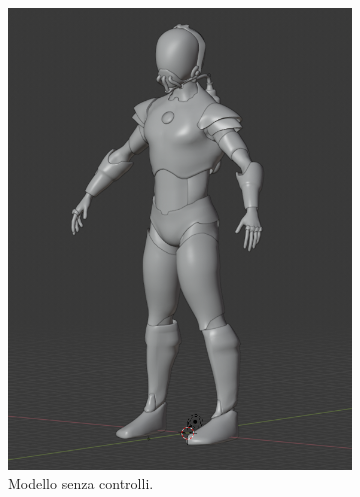 \begin{figure}
\centering
\begin{subfigure}{.33\textwidth}
  \centering
  \includegraphics[width=\linewidth]{Figures/rig0}
  \caption{Modello senza controlli.\\}
  \vspace{13pt}
  \label{fig:rig0}
\end{subfigure}%
\begin{subfigure}{.33\textwidth}
  \centering

\end{subfigure}
\end{figure}
